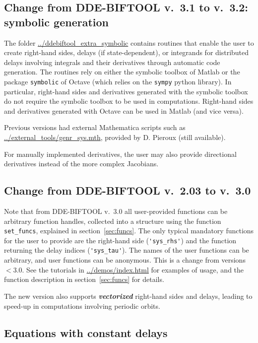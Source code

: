 \documentclass[10pt]{scrartcl}
\newcommand{\DDEBIFCODE}{\textsc{DDE-BIFTOOL}}
\newcommand{\demobase}{\url{../demos/index.html}}
\newcommand{\blist}[1]{\mbox{\lstinline!#1!}}
\begin{document}
\subsection{Change from \DDEBIFCODE{} v.~3.1 to v.~3.2: symbolic generation}
\label{sec:symbolic}
The folder \url{../ddebiftool_extra_symbolic} contains routines that
enable the user to create right-hand sides, delays (if
state-dependent), or integrands for distributed delays involving
integrals and their derivatives through automatic code generation. The
routines rely on either the symbolic toolbox of Matlab or the package
\texttt{symbolic} of Octave (which relies on the \texttt{sympy} python
library). In particular, right-hand sides and derivatives generated
with the symbolic toolbox do not require the symbolic toolbox to be
used in computations. Right-hand sides and derivatives generated with
Octave can be used in Matlab (and vice versa).

Previous versions had external Mathematica scripts such as
\url{../external_tools/genr_sys.mth}, provided by D. Pieroux (still available).

For manually implemented derivatives, the user may also provide
directional derivatives instead of the more complex Jacobians.
\subsection{Change from \DDEBIFCODE{} v.~2.03 to
  v.~3.0} Note that from \DDEBIFCODE{} v.~3.0 all
user-provided functions can be arbitrary function handles, collected
into a structure using the function \blist{set_funcs}, explained in
section~\ref{sec:funcs}. The only typical mandatory functions for the
user to provide are the right-hand side (\blist{'sys_rhs'}) and the
function returning the delay indices (\blist{'sys_tau'}). The names of
the user functions can be arbitrary, and user functions can be
anonymous. This is a change from versions $<3.0$. See the tutorials
in \demobase{} for examples of usage, and the function description in
section~\ref{sec:funcs} for details.

The new version also supports \textbf{\emph{vectorized}} right-hand
sides and delays, leading to speed-up in computations involving periodic orbits.
\subsection{Equations with constant delays}\label{sys_def1}
\end{document}
